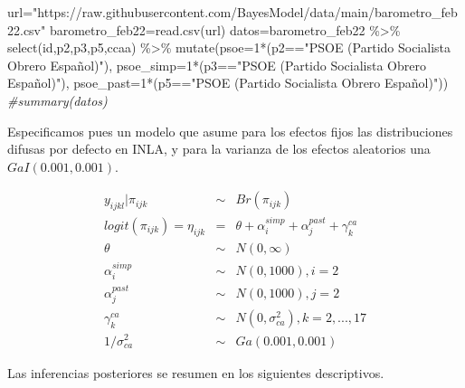 \documentclass[
]{book}
\newenvironment{Shaded}{\begin{snugshade}}{\end{snugshade}}
\newcommand{\AttributeTok}[1]{\textcolor[rgb]{0.77,0.63,0.00}{#1}}
\newcommand{\CommentTok}[1]{\textcolor[rgb]{0.56,0.35,0.01}{\textit{#1}}}
\newcommand{\DecValTok}[1]{\textcolor[rgb]{0.00,0.00,0.81}{#1}}
\newcommand{\FunctionTok}[1]{\textcolor[rgb]{0.00,0.00,0.00}{#1}}
\newcommand{\NormalTok}[1]{#1}
\newcommand{\OtherTok}[1]{\textcolor[rgb]{0.56,0.35,0.01}{#1}}
\newcommand{\SpecialCharTok}[1]{\textcolor[rgb]{0.00,0.00,0.00}{#1}}
\newcommand{\StringTok}[1]{\textcolor[rgb]{0.31,0.60,0.02}{#1}}
\begin{document}
\begin{Shaded}
\begin{Highlighting}[]
\NormalTok{url}\OtherTok{=}\StringTok{"https://raw.githubusercontent.com/BayesModel/data/main/barometro\_feb22.csv"}
\NormalTok{barometro\_feb22}\OtherTok{=}\FunctionTok{read.csv}\NormalTok{(url)}
\NormalTok{datos}\OtherTok{=}\NormalTok{barometro\_feb22 }\SpecialCharTok{\%\textgreater{}\%}
  \FunctionTok{select}\NormalTok{(id,p2,p3,p5,ccaa) }\SpecialCharTok{\%\textgreater{}\%}
  \FunctionTok{mutate}\NormalTok{(}\AttributeTok{psoe=}\DecValTok{1}\SpecialCharTok{*}\NormalTok{(p2}\SpecialCharTok{==}\StringTok{"PSOE (Partido Socialista Obrero Español)"}\NormalTok{),}
         \AttributeTok{psoe\_simp=}\DecValTok{1}\SpecialCharTok{*}\NormalTok{(p3}\SpecialCharTok{==}\StringTok{"PSOE (Partido Socialista Obrero Español)"}\NormalTok{),}
         \AttributeTok{psoe\_past=}\DecValTok{1}\SpecialCharTok{*}\NormalTok{(p5}\SpecialCharTok{==}\StringTok{"PSOE (Partido Socialista Obrero Español)"}\NormalTok{)) }
\CommentTok{\#summary(datos)}
\end{Highlighting}
\end{Shaded}

Especificamos pues un modelo que asume para los efectos fijos las distribuciones difusas por defecto en INLA, y para la varianza de los efectos aleatorios una \(GaI(0.001,0.001)\).

\begin{eqnarray*}
y_{ijkl}|\pi_{ijk} & \sim & Br(\pi_{ijk}) \\
logit(\pi_{ijk}) =\eta_{ijk} &=& \theta + \alpha_i^{simp} + \alpha_j^{past} + \gamma_{k}^{ca} \\
\theta &\sim& N(0,\infty) \\
\alpha_i^{simp}&\sim& N(0,1000), i=2\\
\alpha_j^{past}&\sim& N(0,1000), j=2 \\
\gamma_k^{ca} &\sim& N(0,\sigma_{ca}^2) , k=2,...,17\\
1/\sigma_{ca}^2  &\sim& Ga(0.001,0.001)
\end{eqnarray*}

Las inferencias posteriores se resumen en los siguientes descriptivos.
\end{document}
